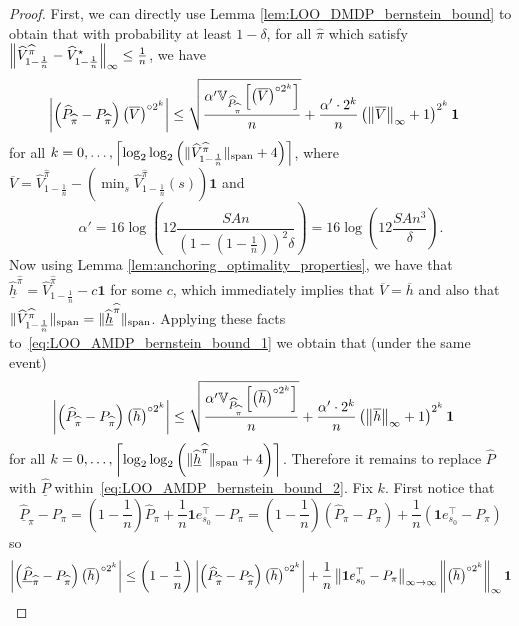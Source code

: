 \documentclass{article}
\theoremstyle{plain}
\theoremstyle{plain}
\theoremstyle{remark}
\theoremstyle{plain}
\theoremstyle{plain}
\newcommand{\Var}{\mathbb{V}}
\newcommand{\Phat}{\widehat{P}}
\newcommand{\Vhat}{\widehat{V}}
\newcommand{\one}{\mathbf{1}}
\newcommand{\pihat}{\widehat{\pi}}
\newcommand{\Vhatstar}{\widehat{V}^\star}
\newcommand{\Vc}{\overline{V}}
\newcommand{\hc}{\overline{h}}
\newcommand{\hhat}{\widehat{h}}
\newcommand{\Phatanc}{\underline{\Phat}}
\newcommand{\hhatanc}{\underline{\hhat}}
\begin{document}
\begin{proof}
    First, we can directly use Lemma \ref{lem:LOO_DMDP_bernstein_bound} to obtain that with probability at least $1 - \delta$, for all $\pihat$ which satisfy $\infnorm{\Vhat_{1-\frac{1}{n}}^{\pihat} - \Vhatstar_{1-\frac{1}{n}}} \leq \frac{1}{n}$, we have
    \begin{align}
        \left| \left(\Phat_{\pihat} - P_{\pihat}\right) \left( \Vc \right)^{\circ 2^k} \right|
    &\leq \sqrt{\frac{\alpha'   \Var_{\Phat_{\pihat}} \left[ \left(\Vc \right)^{\circ 2^k}  \right]    }{n }} + \frac{ \alpha' \cdot 2^k }{n}  \left( \infnorm{\Vc} + 1\right)^{2^k}   \one \label{eq:LOO_AMDP_bernstein_bound_1}
    \end{align}
    for all $k = 0, \dots, \left\lceil\log_2 \log_2 \left( \spannorm{\Vhat_{1-\frac{1}{n}}^{\pihat}} + 4\right) \right\rceil$, where $\Vc = \Vhat_{1 - \frac{1}{n}}^{\pihat} - \left(\min_s \Vhat_{1 - \frac{1}{n}}^{\pihat}(s)\right)\one$ and
    \[
    \alpha' = 16 \log \left(12 \frac{SAn}{(1-(1-\frac{1}{n}))^2 \delta} \right) = 16 \log \left(12 \frac{SAn^3}{ \delta} \right).
    \]
    Now using Lemma \ref{lem:anchoring_optimality_properties}, we have that $\hhatanc^{\pihat} = \Vhat_{1- \frac{1}{n}}^{\pihat} - c \one$ for some $c$, which immediately implies that $\Vc = \hc$ and also that $\spannorm{\Vhat_{1-\frac{1}{n}}^{\pihat}} = \spannorm{\hhatanc^{\pihat}}$. Applying these facts to~\eqref{eq:LOO_AMDP_bernstein_bound_1} we obtain that (under the same event)
    \begin{align}
        \left| \left(\Phat_{\pihat} - P_{\pihat}\right) \left( \hc \right)^{\circ 2^k} \right|
    &\leq \sqrt{\frac{\alpha'   \Var_{\Phat_{\pihat}} \left[ \left(\hc \right)^{\circ 2^k}  \right]    }{n }} + \frac{ \alpha' \cdot 2^k }{n}  \left( \infnorm{\hc} + 1\right)^{2^k}   \one \label{eq:LOO_AMDP_bernstein_bound_2}
    \end{align}
    for all $k = 0, \dots, \left\lceil\log_2 \log_2 \left( \spannorm{\hhatanc^{\pihat}} + 4\right) \right\rceil$. Therefore it remains to replace $\Phat$ with $\Phatanc$ within~\eqref{eq:LOO_AMDP_bernstein_bound_2}. Fix $k$. First notice that 
    \[
        \Phatanc_\pi - P_\pi = (1-\frac{1}{n})\Phat_\pi + \frac{1}{n}\one e_{s_0}^\top - P_\pi = (1-\frac{1}{n}) \left(\Phat_\pi - P_\pi \right) + \frac{1}{n} \left( \one e_{s_0}^\top - P_\pi\right)
    \]
    so
    \begin{align}
         \left| \left(\Phatanc_{\pihat} - P_{\pihat}\right) \left( \hc \right)^{\circ 2^k} \right| 
         &\leq \left( 1 - \frac{1}{n}\right)\left| \left(\Phat_{\pihat} - P_{\pihat}\right) \left( \hc \right)^{\circ 2^k} \right| + \frac{1}{n} \infinfnorm{\one e_{s_0}^\top - P_\pi} \infnorm{\left( \hc \right)^{\circ 2^k}} \one  \nonumber \\

\end{align}
\end{proof}
\end{document}
